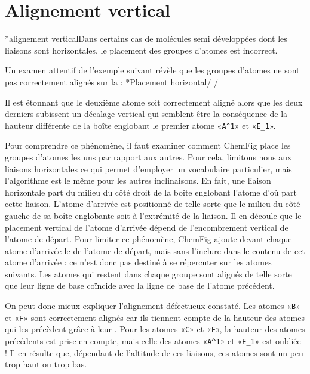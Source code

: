 \documentclass[10pt]{article}
\makeatletter
\newcommand\idx{\@ifstar{\let\print@or@not\@gobble\idx@}{\let\print@or@not\@firstofone\idx@}}
\newcommand\idx@[1]{%
	\ifcat\expandafter\noexpand\@car#1\@nil\relax%
		\expandafter\ifx\@car#1\@nil\protect
			\index{#1}%
			\print@or@not{#1}%
		\else
			\saveexpandmode\expandarg
			\StrSubstitute{\string#1}{\string @}{\@empty\protect\symbol{'100}}[\temp@]%
			\StrGobbleLeft\temp@1[\temp@]%
			\restoreexpandmode
			\expandafter\index\expandafter{\temp@ @\protect\texttt{\protect\textbackslash\temp@}}%
			\print@or@not{\texttt{\string#1}}%
		\fi
	\else
		\index{#1}%
		\print@or@not{#1}%
	\fi
}
\newcommand\make@car@active[1]{%
	\catcode`#1\active
	\begingroup
		\lccode`\~`#1\relax
		\lowercase{\endgroup\def~}%
}
\newif\if@exstar
\newcommand\exemple{%
	\begingroup
	\parskip\z@
	\@makeother\;\@makeother\!\@makeother\?\@makeother\:%
	\@ifstar{\@exstartrue\exemple@}{\@exstarfalse\exemple@}}
\newcommand\exemple@[2][65]{%
	\medbreak\noindent
	\begingroup
		\let\do\@makeother\dospecials
		\make@car@active\ { {}}%
		\make@car@active\^^M{\par\leavevmode}%
		\make@car@active\^^I{\space\space}%
		\make@car@active\,{\leavevmode\kern\z@\string,}%
		\make@car@active\-{\leavevmode\kern\z@\string-}%
		\make@car@active\>{\leavevmode\kern\z@\string>}%
		\make@car@active\<{\leavevmode\kern\z@\string<}%
		\exemple@@{#1}{#2}%
}
\newcommand\exemple@@[3]{%
	\def\@tempa##1#3{\exemple@@@{#1}{#2}{##1}}%
	\@tempa
}
\newcommand\exemple@@@[3]{%
	\xdef\the@code{#3}%
	\endgroup
	\if@exstar
		\begingroup
			\fboxrule0.4pt
			\let\breakboxparindent\z@
			\def\bkvz@bottom{\hrule\@height\fboxrule}%
			\let\bkvz@before@breakbox\relax
			\def\bkvz@set@linewidth{\advance\linewidth\dimexpr-2\fboxrule-2\fboxsep}%
			\def\bkvz@left{\vrule\@width\fboxrule\hskip\fboxsep}%
			\def\bkvz@right{\hskip\fboxsep\vrule\@width\fboxrule}%
			\def\bkvz@top{\hbox to \hsize{%
				\vrule\@width\fboxrule\@height\fboxrule
				\leaders\bkvz@bottom\hfill
				\ECFAugie
				\fboxsep\z@
				\colorbox{black}{\kern0.25em\color{white}\footnotesize\lower0.5ex\hbox{\strut#2}\kern0.25em}%
				\leaders\bkvz@bottom\hfill
				\vrule\@width\fboxrule\@height\fboxrule}}%
			\breakbox
				\kern.5ex\relax
				\ttfamily\footnotesize\the@code\par
				\normalfont
				\kern3pt
				\hrule height0.1pt width\linewidth depth0.1pt
				\vskip5pt
				\rightskip0pt plus 1fill
				\everypar{{\color{lightgray}\rlap{\vrule height0.1pt width\linewidth depth0.1pt}}\hskip0pt plus 1fill}%
				\newlinechar`\^^M\everyeof{\noexpand}\scantokens{#3}\par
			\endbreakbox
		\endgroup
	\else
		\vskip0.5ex
		\boxput*(0,1)
			{\fboxsep\z@
			\hbox{\ECFAugie\colorbox{black}{\leavevmode\kern0.25em{\color{white}\footnotesize\strut#2}\kern0.25em}}%
			}%
			{\fboxsep5pt
			\fbox{%
				$\vcenter{\hsize\dimexpr0.#1\linewidth-\fboxsep-\fboxrule\relax
					\kern5pt\parskip0pt \ttfamily\footnotesize\the@code}%
				\vcenter{\kern5pt\hsize\dimexpr\linewidth-0.#1\linewidth-\fboxsep-\fboxrule\relax
					\everypar{{\color{lightgray}\rlap{\vrule height0.1pt width\dimexpr\linewidth-0.#1\linewidth-\fboxsep-\fboxrule depth0.1pt}}}%
					\footnotesize\newlinechar`\^^M\everyeof{\noexpand}\scantokens{#3}}$%
				}%
			}%
	\fi
	\medbreak
	\endgroup
}
\let\do\@makeother\dospecials
\newcommand\CF{{\ECFAugie ChemFig}\xspace}
\makeatother
\begin{document}
\section{Alignement vertical}\label{alignement.vertical}
\idx*{alignement vertical}Dans certains cas de molécules semi développées dont les liaisons sont horizontales, le placement des groupes d'atomes est incorrect.

Un examen attentif de l'exemple suivant révèle que les groupes d'atomes ne sont pas correctement alignés sur la \idx{ligne de base} :
\exemple*{Placement horizontal}/\Huge\setatomsep{2em}
\qquad
{}/

Il est étonnant que le deuxième atome soit correctement aligné alors que les deux derniers subissent un décalage vertical qui semblent être la conséquence de la hauteur différente de la boîte englobant le premier atome «\verb-A^1-» et «\verb-E_1-».

Pour comprendre ce phénomène, il faut examiner comment \CF place les groupes d'atomes les uns par rapport aux autres. Pour cela, limitons nous aux liaisons horizontales ce qui permet d'employer un vocabulaire particulier, mais l'algorithme est le même pour les autres inclinaisons. En fait, une liaison horizontale part du milieu du côté droit de la boîte englobant l'atome d'où part cette liaison. L'atome d'arrivée est positionné de telle sorte que le milieu du côté gauche de sa boîte englobante soit à l'extrémité de la liaison. Il en découle que le placement vertical de l'atome d'arrivée dépend de l'encombrement vertical de l'atome de départ. Pour limiter ce phénomène, \CF ajoute devant chaque atome d'arrivée le \idx{\vphantom} de l'atome de départ, mais sans l'inclure dans le contenu de cet atome d'arrivée : ce \idx{\vphantom} n'est donc pas destiné à se répercuter sur les atomes suivants. Les atomes qui restent dans chaque groupe sont alignés de telle sorte que leur ligne de base coïncide avec la ligne de base de l'atome précédent.

On peut donc mieux expliquer l'alignement défectueux constaté. Les atomes «\verb-B-» et «\verb-F-» sont correctement alignés car ils tiennent compte de la hauteur des atomes qui les précèdent grâce à leur \idx\vphantom. Pour les atomes «\verb-C-» et «\verb-F-», la hauteur des atomes précédents est prise en compte, mais celle des atomes «\verb-A^1-» et «\verb-E_1-» est oubliée ! Il en résulte que, dépendant de l'altitude de ces liaisons, ces atomes sont un peu trop haut ou trop bas.
\end{document}
